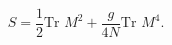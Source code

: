 \begin{equation}\label{action}
    S=\frac{1}{2}\mbox{Tr }M^2+\frac{g}{4N}\mbox{Tr }M^4.
\end{equation}

